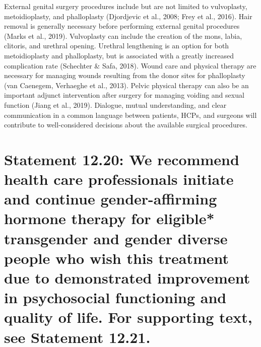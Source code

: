 \documentclass[
]{book}
\begin{document}
External genital surgery procedures include but
are not limited to vulvoplasty, metoidioplasty, and
phalloplasty (Djordjevic et al., 2008; Frey et al.,
2016). Hair removal is generally necessary before
performing external genital procedures (Marks
et al., 2019). Vulvoplasty can include the creation
of the mons, labia, clitoris, and urethral opening.
Urethral lengthening is an option for both
metoidioplasty and phalloplasty, but is associated
with a greatly increased complication rate
(Schechter \& Safa, 2018). Wound care and physical therapy are necessary for managing wounds
resulting from the donor sites for phalloplasty
(van Caenegem, Verhaeghe et al., 2013). Pelvic
physical therapy can also be an important adjunct
intervention after surgery for managing voiding
and sexual function (Jiang et al., 2019). Dialogue,
mutual understanding, and clear communication
in a common language between patients, HCPs,
and surgeons will contribute to well-considered
decisions about the available surgical procedures.

\hypertarget{statement-12.20-we-recommend-health-care-professionals-initiate-and-continue-gender-affirming-hormone-therapy-for-eligible-transgender-and-gender-diverse-people-who-wish-this-treatment-due-to-demonstrated-improvement-in-psychosocial-functioning-and-quality-of-life.-for-supporting-text-see-statement-12.21.}{%
\section*{Statement 12.20: We recommend health care professionals initiate and continue gender-affirming hormone therapy for eligible* transgender and gender diverse people who wish this treatment due to demonstrated improvement in psychosocial functioning and quality of life. For supporting text, see Statement 12.21.}\label{statement-12.20-we-recommend-health-care-professionals-initiate-and-continue-gender-affirming-hormone-therapy-for-eligible-transgender-and-gender-diverse-people-who-wish-this-treatment-due-to-demonstrated-improvement-in-psychosocial-functioning-and-quality-of-life.-for-supporting-text-see-statement-12.21.}}
\end{document}
